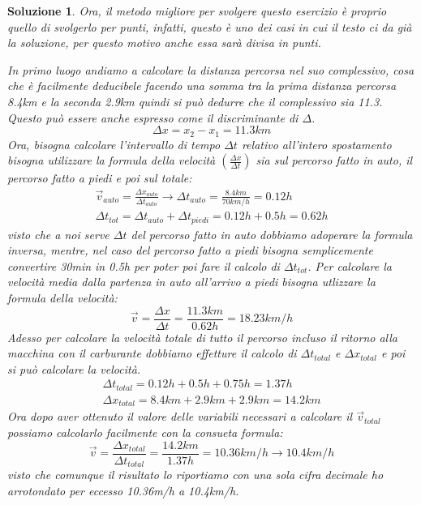 \documentclass{article}
\newtheorem{sol}{Soluzione}
\begin{document}
\begin{sol}
  Ora, il metodo migliore per svolgere questo esercizio è proprio quello di svolgerlo per punti, infatti, questo è uno dei casi in cui il testo ci da già la soluzione, per questo motivo anche essa sarà divisa in punti.
  \begin{tasks}
    \task In primo luogo andiamo a calcolare la distanza percorsa nel suo complessivo, cosa che è facilmente deducibele facendo una somma tra la prima distanza percorsa 8.4km e la seconda 2.9km quindi si può dedurre che il complessivo sia 11.3. Questo può essere anche espresso come il discriminante di $\Delta{}$.
    \begin{equation*}
      \Delta{}x=x_2-x_1=11.3km
    \end{equation*}
    \task Ora, bisogna calcolare l'intervallo di tempo $\Delta{}t$ relativo all'intero spostamento bisogna utilizzare la formula della velocità $\left(\frac{\Delta{}x}{\Delta{}t}\right)$ sia sul percorso fatto in auto, il percorso fatto a piedi e poi sul totale:
    \begin{eqnarray*}
      \vec{v}_{auto}=\frac{\Delta{}x_{auto}}{\Delta{}t_{auto}}\to \Delta{}t_{auto}=\frac{8.4km}{70km/h}=0.12h\\
      \Delta{}t_{tot}=\Delta{}t_{auto}+\Delta{}t_{piedi}=0.12h+0.5h=0.62h
    \end{eqnarray*}
    visto che a noi serve $\Delta{}t$ del percorso fatto in auto dobbiamo adoperare la formula inversa, mentre, nel caso del percorso fatto a piedi bisogna semplicemente convertire 30min in 0.5h per poter poi fare il calcolo di $\Delta{}t_{tot}$. 
    \task Per calcolare la velocità media dalla partenza in auto all'arrivo a piedi bisogna utlizzare la formula della velocità:
    \begin{equation*}
      \vec{v}=\frac{\Delta{}x}{\Delta{}t} = \frac{11.3km}{0.62h}=18.23km/h
    \end{equation*}
    \task Adesso per calcolare la velocità totale di tutto il percorso incluso il ritorno alla macchina con il carburante dobbiamo effetture il calcolo di $\Delta{}t_{total}$ e $\Delta{}x_{total}$ e poi si può calcolare la velocità.
    \begin{eqnarray*}
      \Delta{}t_{total} = 0.12h + 0.5h + 0.75h = 1.37h\\
      \Delta{}x_{total} = 8.4km + 2.9km + 2.9km =14.2km 
    \end{eqnarray*}
    Ora dopo aver ottenuto il valore delle variabili necessari a calcolare il $\vec{v}_{total}$ possiamo calcolarlo facilmente con la consueta formula:
    \begin{equation*}
      \vec{v}=\frac{\Delta{}x_{total}}{\Delta{}t_{total}} = \frac{14.2km}{1.37h}=10.36km/h \to 10.4km/h
    \end{equation*}
    visto che comunque il risultato lo riportiamo con una sola cifra decimale ho arrotondato per eccesso 10.36m/h a 10.4km/h.
  \end{tasks}
\end{sol}
\end{document}
